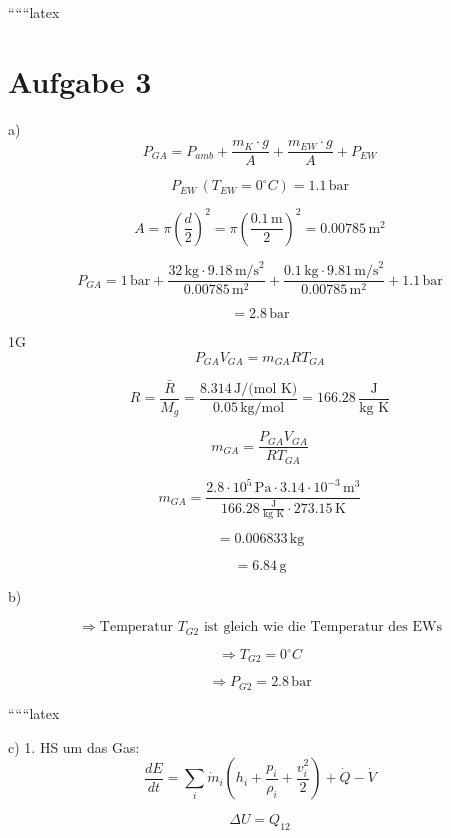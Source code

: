 
``````latex


\section*{Aufgabe 3}

a) 
\[
P_{GA} = P_{amb} + \frac{m_K \cdot g}{A} + \frac{m_{EW} \cdot g}{A} + P_{EW}
\]

\[
P_{EW} \, (T_{EW} = 0^\circ C) = 1.1 \, \text{bar}
\]

\[
A = \pi \left( \frac{d}{2} \right)^2 = \pi \left( \frac{0.1 \, \text{m}}{2} \right)^2 = 0.00785 \, \text{m}^2
\]

\[
P_{GA} = 1 \, \text{bar} + \frac{32 \, \text{kg} \cdot 9.18 \, \text{m/s}^2}{0.00785 \, \text{m}^2} + \frac{0.1 \, \text{kg} \cdot 9.81 \, \text{m/s}^2}{0.00785 \, \text{m}^2} + 1.1 \, \text{bar}
\]

\[
= 2.8 \, \text{bar}
\]

1G 
\[
P_{GA} V_{GA} = m_{GA} R T_{GA}
\]

\[
R = \frac{\bar{R}}{M_g} = \frac{8.314 \, \text{J/(mol K)}}{0.05 \, \text{kg/mol}} = 166.28 \, \frac{\text{J}}{\text{kg K}}
\]

\[
m_{GA} = \frac{P_{GA} V_{GA}}{R T_{GA}}
\]

\[
m_{GA} = \frac{2.8 \cdot 10^5 \, \text{Pa} \cdot 3.14 \cdot 10^{-3} \, \text{m}^3}{166.28 \, \frac{\text{J}}{\text{kg K}} \cdot 273.15 \, \text{K}}
\]

\[
= 0.006833 \, \text{kg}
\]

\[
= 6.84 \, \text{g}
\]

b) 

\[
\Rightarrow \text{Temperatur } T_{G2} \text{ ist gleich wie die Temperatur des EWs}
\]

\[
\Rightarrow T_{G2} = 0^\circ C
\]

\[
\Rightarrow P_{G2} = 2.8 \, \text{bar}
\]

``````latex


c) 1. HS um das Gas:
\begin{equation}
\frac{dE}{dt} = \sum_i \dot{m}_i (h_i + \frac{p_i}{\rho_i} + \frac{v_i^2}{2}) + \dot{Q} - \dot{V}
\end{equation}

\begin{equation}
\Delta U = Q_{12}
\end{equation}

